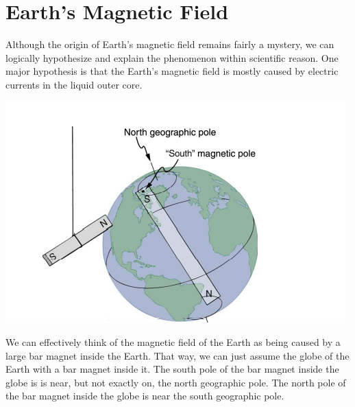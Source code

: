 \documentclass[9pt]{exam}
\begin{document}
	\section*{Earth's Magnetic Field}
	Although the origin of Earth's magnetic field remains fairly a mystery, we can logically hypothesize and explain the phenomenon within scientific reason. One major hypothesis is that the Earth's magnetic field is mostly caused by electric currents in the liquid outer core. 
	\begin{center}
		\includegraphics[scale=0.2]{earth_magnetic_field}
	\end{center}
	We can effectively think of the magnetic field of the Earth as being caused by a large bar magnet inside the Earth. That way, we can just assume the globe of the Earth with a bar magnet inside it. The south pole of the bar magnet inside the globe is is near, but not exactly on, the north geographic pole. The north pole of the bar magnet inside the globe is near the south geographic pole. \\ \\
\end{document}
